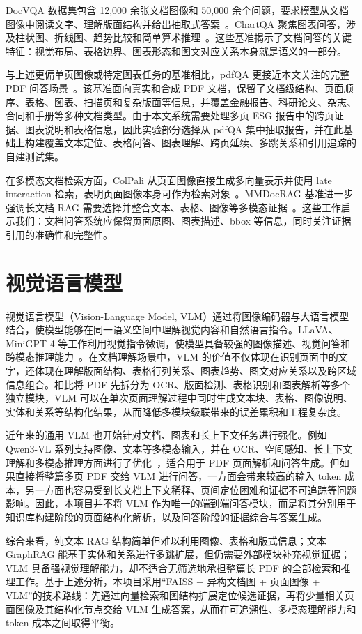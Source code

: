 DocVQA 数据集包含 12,000 余张文档图像和 50,000 余个问题，要求模型从文档图像中阅读文字、理解版面结构并给出抽取式答案~\cite{mathew2021docvqa}。ChartQA 聚焦图表问答，涉及柱状图、折线图、趋势比较和简单算术推理~\cite{masry2022chartqa}。这些基准揭示了文档问答的关键特征：视觉布局、表格边界、图表形态和图文对应关系本身就是语义的一部分。

与上述更偏单页图像或特定图表任务的基准相比，pdfQA 更接近本文关注的完整 PDF 问答场景~\cite{schimanski2026pdfqa}。该基准面向真实和合成 PDF 文档，保留了文档级结构、页面顺序、表格、图表、扫描页和复杂版面等信息，并覆盖金融报告、科研论文、杂志、合同和手册等多种文档类型。由于本文系统需要处理多页 ESG 报告中的跨页证据、图表说明和表格信息，因此实验部分选择从 pdfQA 集中抽取报告，并在此基础上构建覆盖文本定位、表格问答、图表理解、跨页延续、多跳关系和引用追踪的自建测试集。

在多模态文档检索方面，ColPali 从页面图像直接生成多向量表示并使用 late interaction 检索，表明页面图像本身可作为检索对象~\cite{faysse2024colpali}。MMDocRAG 基准进一步强调长文档 RAG 需要选择并整合文本、表格、图像等多模态证据~\cite{dong2025mmdocrag}。这些工作启示我们：文档问答系统应保留页面原图、图表描述、bbox 等信息，同时关注证据引用的准确性和完整性。

\section{视觉语言模型}

视觉语言模型（Vision-Language Model, VLM）通过将图像编码器与大语言模型结合，使模型能够在同一语义空间中理解视觉内容和自然语言指令。LLaVA、MiniGPT-4 等工作利用视觉指令微调，使模型具备较强的图像描述、视觉问答和跨模态推理能力~\cite{liu2023llava,zhu2023minigpt4}。在文档理解场景中，VLM 的价值不仅体现在识别页面中的文字，还体现在理解版面结构、表格行列关系、图表趋势、图文对应关系以及跨区域信息组合。相比将 PDF 先拆分为 OCR、版面检测、表格识别和图表解析等多个独立模块，VLM 可以在单次页面理解过程中同时生成文本块、表格、图像说明、实体和关系等结构化结果，从而降低多模块级联带来的误差累积和工程复杂度。

近年来的通用 VLM 也开始针对文档、图表和长上下文任务进行强化。例如 Qwen3-VL 系列支持图像、文本等多模态输入，并在 OCR、空间感知、长上下文理解和多模态推理方面进行了优化~\cite{qwen2025qwen3vl}，适合用于 PDF 页面解析和问答生成。但如果直接将整篇多页 PDF 交给 VLM 进行问答，一方面会带来较高的输入 token 成本，另一方面也容易受到长文档上下文稀释、页间定位困难和证据不可追踪等问题影响。因此，本项目并不将 VLM 作为唯一的端到端问答模块，而是将其分别用于知识库构建阶段的页面结构化解析，以及问答阶段的证据综合与答案生成。

综合来看，纯文本 RAG 结构简单但难以利用图像、表格和版式信息；文本 GraphRAG 能基于实体和关系进行多跳扩展，但仍需要外部模块补充视觉证据；VLM 具备强视觉理解能力，却不适合无筛选地承担整篇长 PDF 的全部检索和推理工作。基于上述分析，本项目采用``FAISS + 异构文档图 + 页面图像 + VLM''的技术路线：先通过向量检索和图结构扩展定位候选证据，再将少量相关页面图像及其结构化节点交给 VLM 生成答案，从而在可追溯性、多模态理解能力和 token 成本之间取得平衡。
